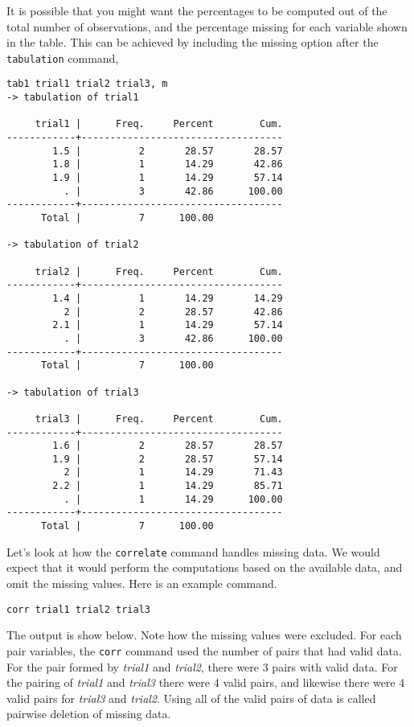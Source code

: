 It is possible that you might want the percentages to be computed out of the total number of observations, and the percentage missing for each variable shown in the table. This can be achieved by including the missing option after the \lstinline{tabulation} command,

\begin{lstlisting}
tab1 trial1 trial2 trial3, m
-> tabulation of trial1

     trial1 |      Freq.     Percent        Cum.
------------+-----------------------------------
        1.5 |          2       28.57       28.57
        1.8 |          1       14.29       42.86
        1.9 |          1       14.29       57.14
          . |          3       42.86      100.00
------------+-----------------------------------
      Total |          7      100.00

-> tabulation of trial2

     trial2 |      Freq.     Percent        Cum.
------------+-----------------------------------
        1.4 |          1       14.29       14.29
          2 |          2       28.57       42.86
        2.1 |          1       14.29       57.14
          . |          3       42.86      100.00
------------+-----------------------------------
      Total |          7      100.00

-> tabulation of trial3

     trial3 |      Freq.     Percent        Cum.
------------+-----------------------------------
        1.6 |          2       28.57       28.57
        1.9 |          2       28.57       57.14
          2 |          1       14.29       71.43
        2.2 |          1       14.29       85.71
          . |          1       14.29      100.00
------------+-----------------------------------
      Total |          7      100.00
\end{lstlisting}

Let's look at how the \lstinline{correlate} command handles missing data. We would expect that it would perform the computations based on the available data, and omit the missing values. Here is an example command.

\begin{lstlisting}
corr trial1 trial2 trial3
\end{lstlisting}

The output is show below. Note how the missing values were excluded. For each pair variables, the \lstinline{corr} command used the number of pairs that had valid data. For the pair formed by \textit{trial1} and  \textit{trial2}, there were 3 pairs with valid data. For the pairing of \textit{trial1} and  \textit{trial3}  there were 4 valid pairs, and likewise there were 4 valid pairs for \textit{trial3} and  \textit{trial2}. Using all of the valid pairs of data is called pairwise deletion of missing data.

